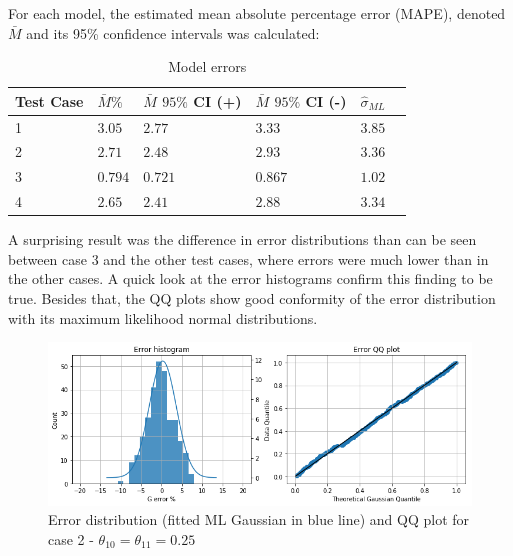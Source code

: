 For each model, the estimated mean absolute percentage error (MAPE), denoted \(\bar{M}\) and its 95\% confidence intervals was calculated:

\begin{table}[H]
\begin{center}
\begin{tabular}{@{}llllll@{}}
\toprule
 Test Case & \(\bar{M} \%\) & \(\bar{M}\) \(95\%\) CI (+) & \(\bar{M}\) \(95\%\) CI (-) & \(\hat{\sigma}_{ML}\)\\ \midrule
    1 &\(3.05\) & \(2.77\) & \(3.33\) & \(3.85\) &  \\ 
    2 &\(2.71\) & \(2.48\) & \(2.93\) & \(3.36\) &  \\ 
    3 &\(0.794\) & \(0.721\) & \(0.867\) & \(1.02\) &  \\ 
    4 &\(2.65\) & \(2.41\) & \(2.88\) & \(3.34\) &  \\  \bottomrule
\end{tabular}
\end{center}
\caption{Model errors}
\label{tab:specific_models_error}
\end{table} 

A surprising result was the difference in error distributions than can be seen between case 3 and the other test cases, where errors were much lower than in the other cases. A quick look at the error histograms confirm this finding to be true. Besides that, the QQ plots show good conformity of the error distribution with its maximum likelihood normal distributions.

\begin{figure}[!htb]
\begin{center}
    \centering
    \includegraphics[width=1.0\textwidth]{Chap6_EvaluationAndAnalysis/images/Error_model_D_1_1_025_025_N_3_3.png}
\caption{Error distribution (fitted ML Gaussian in blue line) and QQ plot for case 2 -  \(\theta_{10}=\theta_{11}=0.25\)}
\label{fig:error_model_D_1_1_025_025_N_3_3}
\end{center}
\end{figure}

